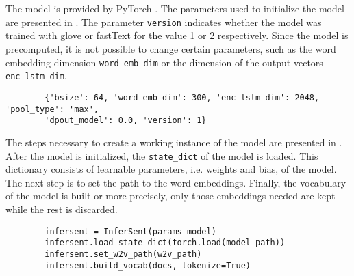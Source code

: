 \section{\infersent{}}\label{sec:impl-infersent}

The \infersent{} model is provided by PyTorch \cite{HfsentTrans2019}.
The parameters used to initialize the model are presented in .
The parameter \texttt{version} indicates whether the model was trained with \acs{glove} or fastText for the value 1 or 2 respectively.
Since the model is precomputed, it is not possible to change certain parameters, 
such as the word embedding dimension \texttt{word\_emb\_dim} or the dimension of the output vectors \texttt{enc\_lstm\_dim}.

\begin{listing}[htp]
    \begin{verbatim}
        {'bsize': 64, 'word_emb_dim': 300, 'enc_lstm_dim': 2048, 'pool_type': 'max', 
        'dpout_model': 0.0, 'version': 1}
    \end{verbatim}
    \caption{Parameters of the \infersent{} model.
    }
    \label{lst:infersent-params}
\end{listing}

The steps necessary to create a working instance of the \infersent{} model are presented in .
After the \infersent{} model is initialized, the \texttt{state\_dict} of the model is loaded.
This dictionary consists of learnable parameters, i.e. weights and bias, of the model.
The next step is to set the path to the word embeddings.
Finally, the vocabulary of the model is built or more precisely, only those embeddings needed are kept while the rest is discarded.

\begin{listing}[htp]
    \begin{verbatim}
        infersent = InferSent(params_model)
        infersent.load_state_dict(torch.load(model_path))
        infersent.set_w2v_path(w2v_path)
        infersent.build_vocab(docs, tokenize=True)
    \end{verbatim}
    \caption{Initializing the \infersent{} model.
    }
    \label{lst:infersent-init}
\end{listing}

